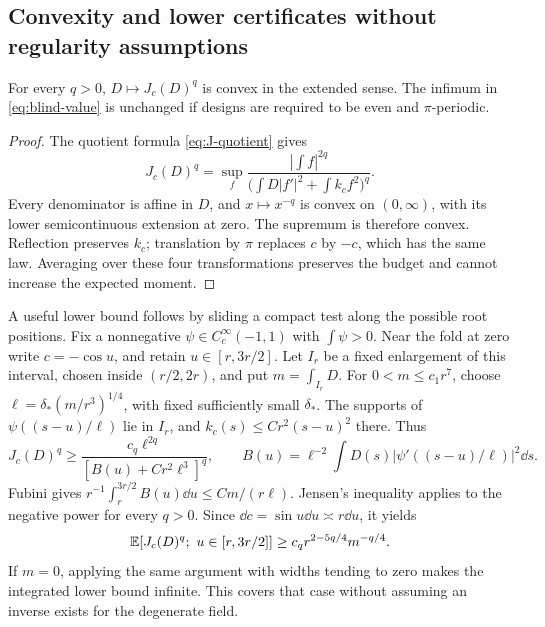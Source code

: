 \subsection{Convexity and lower certificates without regularity assumptions}
\begin{lemma}\label{lem:blind-convex}
For every $q>0$, $D\mapsto J_c(D)^q$ is convex in the extended sense.
The infimum in \eqref{eq:blind-value} is unchanged if designs are
required to be even and $\pi$-periodic.
\end{lemma}
\begin{proof}
The quotient formula \eqref{eq:J-quotient} gives
\[
 J_c(D)^q=\sup_f
 \frac{|\int f|^{2q}}{\bigl(\int D|f'|^2+\int k_cf^2\bigr)^q}.
\]
Every denominator is affine in $D$, and $x\mapsto x^{-q}$ is convex
on $(0,\infty)$, with its lower semicontinuous extension at zero.
The supremum is therefore convex. Reflection preserves $k_c$;
translation by $\pi$ replaces $c$ by $-c$, which has the same law.
Averaging over these four transformations preserves the budget and
cannot increase the expected moment.
\end{proof}

A useful lower bound follows by sliding a compact test along the possible
root positions. Fix a nonnegative $\psi\in C_c^\infty(-1,1)$ with
$\int\psi>0$. Near the fold at zero write $c=-\cos u$, and retain
$u\in[r,3r/2]$. Let $I_r$ be a fixed enlargement of this interval,
chosen inside $(r/2,2r)$, and put $m=\int_{I_r}D$.
For $0<m\le c_1r^7$, choose
$\ell=\delta_*(m/r^3)^{1/4}$, with fixed sufficiently small $\delta_*$.
The supports of $\psi((s-u)/\ell)$ lie in $I_r$, and
$k_c(s)\le Cr^2(s-u)^2$ there. Thus
\[
 J_c(D)^q\ge
 \frac{c_q\ell^{2q}}{[B(u)+Cr^2\ell^3]^q},\qquad
 B(u)=\ell^{-2}\int D(s)|\psi'((s-u)/\ell)|^2\dd s.
\]
Fubini gives $r^{-1}\int_r^{3r/2}B(u)\dd u\le Cm/(r\ell)$.
Jensen's inequality applies to the negative power for every $q>0$.
Since $\dd c=\sin u\dd u\asymp r\dd u$, it yields
\begin{equation}\label{eq:blind-shell}
 \mathbb E[J_c(D)^q;\ u\in[r,3r/2]]
       \ge c_q r^{2-5q/4}m^{-q/4}.
\end{equation}
If $m=0$, applying the same argument with widths tending to zero
makes the integrated lower bound infinite. This covers that case
without assuming an inverse exists for the degenerate field.

